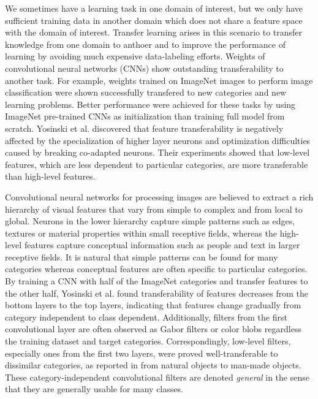 We sometimes have a learning task in one domain of interest, but we only have sufficient training data in another domain which does not share a feature space with the domain of interest.
Transfer learning arises in this scenario to transfer knowledge from one domain to anthoer and to improve the performance of learning by avoiding much expensive data-labeling efforts.\cite{pan2010survey}
Weights of convolutional neural networks (CNNs) show outstanding transferability to another task.
For example, weights trained on ImageNet images to perform image classification were shown successfully transfered to new categories and new learning problems\cite{girshick2014rich,long2015fully,shin2016deep}.
Better performance were achieved for these tasks by using ImageNet pre-trained CNNs as initialization than training full model from scratch.
Yosinski et al. discovered that feature transferability is negatively affected by the specialization of higher layer neurons and optimization difficulties caused by breaking co-adapted neurons.
Their experiments showed that low-level features, which are less dependent to particular categories, are more transferable than high-level features.

Convolutional neural networks for processing images are believed to extract a rich hierarchy of visual features that vary from simple to complex and from local to global.\cite{girshick2014rich}
Neurons in the lower hierarchy capture simple patterns such as edges, textures or material properties within small receptive fields, whereas the high-level features capture conceptual information such as people and text in larger receptive fields.
It is natural that simple patterns can be found for many categories whereas conceptual features are often specific to particular categories.
By training a CNN with half of the ImageNet categories and transfer features to the other half, Yosinski et al.\cite{yosinski2014transferable} found transferability of features decreases from the bottom layers to the top layers, indicating that features change gradually from category independent to class dependent.
Additionally, filters from the first convolutional layer are often observed as Gabor filters or color blobs regardless the training dataset and target categories.\cite{zeiler2014visualizing,lee2009convolutional,krizhevsky2012imagenet,shin2016deep}
Correspondingly, low-level filters, especially ones from the first two layers, were proved well-transferable to dissimilar categories, as reported in \cite{yosinski2014transferable} from natural objects to man-made objects.
These category-independent convolutional filters are denoted \textit{general} in the sense that they are generally usable for many classes.

